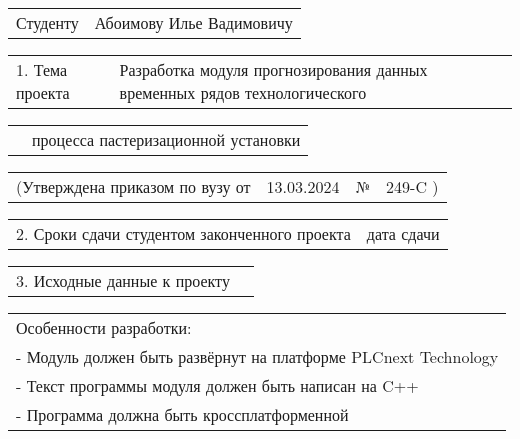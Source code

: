 \documentclass[12pt, А4, twoside]{article} %
\begin{document}
\begin{FlushLeft} 
\fontsize{12}{15} %

    \begin{tabular}{p{1.9cm} p{14.95cm}}
        \textsf{Студенту} & 
        \textsf{Абоимову Илье Вадимовичу} \vspace{1pt} \hline 
    \end{tabular} 

    \begin{tabular}{p{2.8cm} p{14.05cm}}
        \textsf{1. Тема проекта} & 
        \textsf{Разработка модуля прогнозирования данных временных рядов технологического} \vspace{1pt} \hline  
    \end{tabular} 

    \begin{tabular}{p{2.8cm} p{14.05cm}} 
        & \textsf{процесса пастеризационной установки} \vspace{1pt} \hline 
    \end{tabular} 

    \begin{tabular}{p{5.9cm} p{4.8cm} p{0.3cm} p{5.0cm}} 
        \textsf{(Утверждена приказом по вузу от} &
        \centering \textsf{13.03.2024} \vspace{2pt} \hline &
        \centering \textsf{№} &
        \centering \textsf{249-C \hspace{0.5cm} )} \hline
    \end{tabular} 

    \begin{tabular}{p{9.4cm} p{7.45cm}} 
        \textsf{2. Сроки сдачи студентом законченного проекта} &
        \centering \textsf{дата сдачи} \vspace{1pt} \hline
    \end{tabular} 

    \begin{tabular}{p{5.7cm} p{11.15cm}} 
        \textsf{3. Исходные данные к проекту} &
        \vspace{1pt} \hline
    \end{tabular}   

    \begin{tabular}{p{17.25cm}}  
        \hspace{0.3cm} \textsf{Особенности разработки:} \vspace{1pt} \hline \\
        \hspace{0.6cm} \textsf{- Модуль должен быть развёрнут на платформе PLCnext Technology} \vspace{1pt} \hline \\
        \hspace{0.6cm} \textsf{- Текст программы модуля должен быть написан на C++}\vspace{1pt} \hline \\
        \hspace{0.6cm} \textsf{- Программа должна быть кроссплатформенной}\vspace{1pt} \hline 
    \end{tabular}   


\end{FlushLeft}
\end{document}
